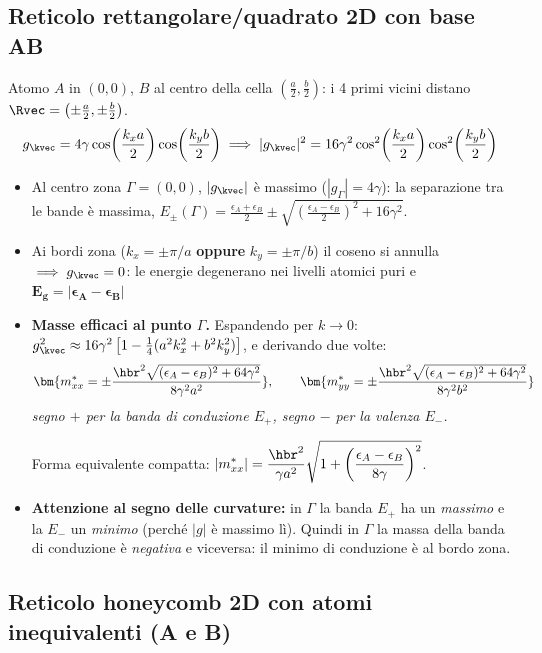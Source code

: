 \subsection{Reticolo rettangolare/quadrato 2D con base AB}
Atomo $A$ in $(0,0)$, $B$ al centro della cella $\left(\frac a2,\frac b2\right)$: i 4 primi vicini distano $\Rvec = \left(\pm\frac a2,\pm\frac b2\right)$.
\[ g_{\kvec} = 4\gamma\cos\!\left(\frac{k_x a}{2}\right)\cos\!\left(\frac{k_y b}{2}\right)
   \implies |g_{\kvec}|^2 = 16\gamma^2\cos^2\!\left(\frac{k_x a}{2}\right)\cos^2\!\left(\frac{k_y b}{2}\right) \]
\begin{itemize}
    \item Al centro zona $\Gamma=(0,0)$, $|g_\kvec|$ è massimo ($|g_\Gamma|=4\gamma$): la separazione tra le bande è massima,
    $E_\pm(\Gamma)=\frac{\epsilon_A+\epsilon_B}{2}\pm\sqrt{\left(\frac{\epsilon_A-\epsilon_B}{2}\right)^2+16\gamma^2}$.
    \item Ai bordi zona ($k_x=\pm\pi/a$ \textbf{oppure} $k_y=\pm\pi/b$) il coseno si annulla $\implies g_\kvec=0$: le energie degenerano nei livelli atomici puri e $\bm{E_g = |\epsilon_A-\epsilon_B|}$
    \item \textbf{Masse efficaci al punto $\Gamma$.} Espandendo per $k\to0$:
    $g_\kvec^2 \approx 16\gamma^2\left[1-\frac14(a^2k_x^2+b^2k_y^2)\right]$, e derivando due volte:
    \[ \bm{m^*_{xx} = \pm\frac{\hbr^2\sqrt{(\epsilon_A-\epsilon_B)^2+64\gamma^2}}{8\gamma^2a^2}},\qquad
       \bm{m^*_{yy} = \pm\frac{\hbr^2\sqrt{(\epsilon_A-\epsilon_B)^2+64\gamma^2}}{8\gamma^2b^2}} \]
    \textit{segno $+$ per la banda di conduzione $E_+$, segno $-$ per la valenza $E_-$.}
    
    Forma equivalente compatta: $\displaystyle |m^*_{xx}| = \frac{\hbr^2}{\gamma a^2}\sqrt{1+\left(\frac{\epsilon_A-\epsilon_B}{8\gamma}\right)^2}$.
    \item \textbf{Attenzione al segno delle curvature:} in $\Gamma$ la banda $E_+$ ha un \emph{massimo} e la $E_-$ un \emph{minimo} (perché $|g|$ è massimo lì). Quindi in $\Gamma$ la massa della banda di conduzione è \emph{negativa} e viceversa: il minimo di conduzione è al bordo zona.
\end{itemize}

\subsection{Reticolo honeycomb 2D con atomi inequivalenti (A e B)}

